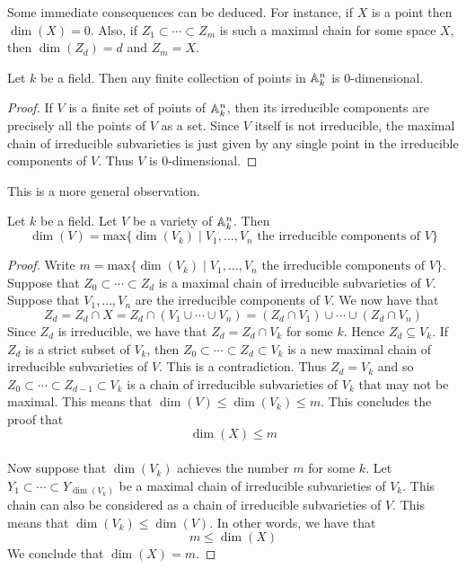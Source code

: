 \documentclass[a4paper]{article}
\begin{document}
Some immediate consequences can be deduced. For instance, if $X$ is a point then $\dim(X)=0$. Also, if $Z_1\subset\cdots\subset Z_m$ is such a maximal chain for some space $X$, then $\dim(Z_d)=d$ and $Z_m=X$. 

\begin{eg}{}{} Let $k$ be a field. Then any finite collection of points in $\mathbb{A}_k^n$ is $0$-dimensional. \tcbline
\begin{proof}
If $V$ is a finite set of points of $\mathbb{A}_k^n$, then its irreducible components are precisely all the points of $V$ as a set. Since $V$ itself is not irreducible, the maximal chain of irreducible subvarieties is just given by any single point in the irreducible components of $V$. Thus $V$ is $0$-dimensional. 
\end{proof}
\end{eg}

This is a more general observation. 

\begin{lmm}{}{} Let $k$ be a field. Let $V$ be a variety of $\mathbb{A}_k^n$. Then $$\dim(V)=\text{max}\{\dim(V_k)\;|\;V_1,\dots,V_n\text{ the irreducible components of }V\}$$ \tcbline
\begin{proof}
Write $m=\text{max}\{\dim(V_k)\;|\;V_1,\dots,V_n\text{ the irreducible components of }V\}$. Suppose that $Z_0\subset\cdots\subset Z_d$ is a maximal chain of irreducible subvarieties of $V$. Suppose that $V_1,\dots,V_n$ are the irreducible components of $V$. We now have that $$Z_d=Z_d\cap X=Z_d\cap(V_1\cup\cdots\cup V_n)=(Z_d\cap V_1)\cup\cdots\cup(Z_d\cap V_n)$$ Since $Z_d$ is irreducible, we have that $Z_d=Z_d\cap V_k$ for some $k$. Hence $Z_d\subseteq V_k$. If $Z_d$ is a strict subset of $V_k$, then $Z_0\subset\cdots\subset Z_d\subset V_k$ is a new maximal chain of irreducible subvarieties of $V$. This is a contradiction. Thus $Z_d=V_k$ and so $Z_0\subset\cdots\subset Z_{d-1}\subset V_k$ is a chain of irreducible subvarieties of $V_k$ that may not be maximal. This means that $\dim(V)\leq\dim(V_k)\leq m$. This concludes the proof that $$\dim(X)\leq m$$~\\

Now suppose that $\dim(V_k)$ achieves the number $m$ for some $k$. Let $Y_1\subset\cdots\subset Y_{\dim(V_k)}$ be a maximal chain of irreducible subvarieties of $V_k$. This chain can also be considered as a chain of irreducible subvarieties of $V$. This means that $\dim(V_k)\leq\dim(V)$. In other words, we have that $$m\leq\dim(X)$$ We conclude that $\dim(X)=m$. 
\end{proof}
\end{lmm}
\end{document}
